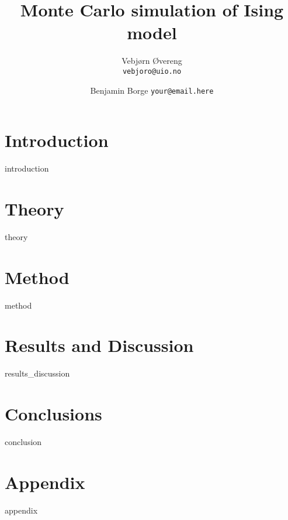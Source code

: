\documentclass[a4paper,10pt,english]{article}
\title{Monte Carlo simulation of Ising model}
\author{Vebjørn Øvereng\\
        \texttt{vebjoro@uio.no}
        \and
        Benjamin Borge
        \texttt{your@email.here}}
\begin{document}
  \maketitle


\section{Introduction}
{introduction}
\section{Theory}
{theory}

\section{Method}
{method}

\section{Results and Discussion}\label{sec:results}
{results_discussion}

\section{Conclusions}
{conclusion}

\section{Appendix}\label{sec:app}
{appendix}

\end{document}
